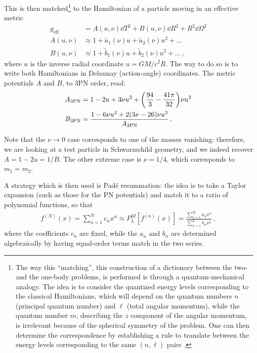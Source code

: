 \documentclass[main.tex]{subfiles}
\begin{document}
This is then matched\footnote{The way this ``matching'', this construction of a dictionary between the two- and the one-body problems, is performed is through a quantum-mechanical analogy. The idea is to consider the quantized energy levels corresponding to the classical Hamiltonians, which will depend on the quantum numbers \(n\) (principal quantum number) and \(\ell\) (total angular momentum),  while the quantum number \(m\), describing  the \(z\) component of the angular momentum, is irrelevant because of the spherical symmetry of the problem. One can then determine the correspondence by establishing a rule to translate between the energy levels corresponding to the same \((n, \ell)\) pairs \cite{damourGeneralRelativisticTwo2014}.} to the Hamiltonian of a particle moving in an effective metric 
%
\begin{align}
g _{\text{eff}} &= A(u, \nu ) \dd{T^2} + B(u, \nu) \dd{R^2} + R^2 \dd{\Omega^2}  \\
A(u, \nu ) &\approx 1 + \widetilde{a}_1 (\nu ) u + \widetilde{a}_2 (\nu ) u^2 + \dots  \\
B(u, \nu ) &\approx 1 + \widetilde{b}_1 (\nu ) u + \widetilde{b}_2 (\nu ) u^2 + \dots  
\,,
\end{align}
%
where \(u\) is the inverse radial coordinate \(u = GM / c^2 R\). 
The way to do so is to write both Hamiltonians in Delaunay (action-angle) coordinates. 
The metric potentials \(A\) and \(B\), to 3PN order, read: 
%
\begin{align}
A _{\text{3PN}} &= 1 - 2u + 3 \nu u^2 + \qty( \frac{94}{3} - \frac{41 \pi }{32}) \nu u^3  \\
B _{\text{3PN}} &= \frac{1 - 6 \nu u^2 + 2 (3 \nu - 26) \nu u^3}{A _{\text{3PN}}}
\,.
\end{align}

Note that the \(\nu \to 0\) case corresponds to one of the masses vanishing: therefore, we are looking at a test particle in Schwarzschild geometry, and we indeed recover \(A = 1-2u = 1/B\).
The other extreme case is \(\nu = 1/4\), which corresponds to \(m_1 = m_2 \). 

A strategy which is then used is Padé resummation: 
the idea is to take a Taylor expansion (such as those for the \ac{PN} potentials) and match it to 
a ratio of polynomial functions, so that 
%
\begin{align}
f^{(N)}(x) = \sum _{n=1}^{N} c_n x^{n} \approx P_{L}^{M}[f^{(n)}(x)] = \frac{\sum _{n=1}^{M} a_n x^{n}}{\sum _{n=1}^{L} b_n x^{n}}
\,,
\end{align}
%
where the coefficients \(c_n\) are fixed, while the \(a_n\) and \(b_n\) are determined algebraically 
by having equal-order terms match in the two series. 
\end{document}
